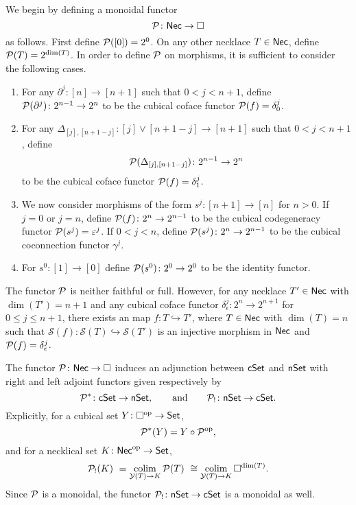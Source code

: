 We begin by defining a monoidal functor
\[
\mathcal{P} \colon \mathsf{Nec} \to \square
\]
as follows. First define $\mathcal{P}([0])=2^0$.
On any other necklace $T \in \mathsf{Nec}$, define $\mathcal{P}(T) = 2^{\dim(T)}$.
In order to define $\mathcal{P}$ on morphisms, it is sufficient to consider the following cases.
\begin{enumerate}
	\item For any $\partial^j \colon [n] \to [n+1]$ such that $0< j<{n+1}$, define $\mathcal{P}(\partial^j) \colon 2^{n-1}\to 2^{n}$ to be the cubical coface functor $\mathcal{P}(f)= \delta_0^{j}$.

	\item For any $\Delta_{[j], [n+1-j]} \colon [j] \vee [n+1-j] \to [n+1]$ such that $0<j<n+1$, define
	\[
	\mathcal{P}(\Delta_{[j], [n+1-j]}) \colon 2^{n-1}\to 2^{n}
	\]
	to be the cubical coface functor $\mathcal{P}(f)=\delta_1^{j}$.

	\item We now consider morphisms of the form $s^j \colon [n+1] \to [n]$ for $n>0$.
	If $j=0$ or $j=n$, define $\mathcal{P}(f) \colon 2^n \to 2^{n-1}$ to be the cubical codegeneracy functor $\mathcal{P}(s^j)= \varepsilon^{j}$.
	If $0<j<n$, define $\mathcal{P}(s^j) \colon 2^n \to 2^{n-1}$ to be the cubical coconnection functor $\gamma^{j}$.

	\item For $s^0 \colon [1] \to [0]$ define $\mathcal{P}(s^0) \colon 2^0 \to 2^0$ to be the identity functor.
\end{enumerate}

\begin{remark}
	The functor $\mathcal{P}$ is neither faithful or full.
	However, for any necklace $T' \in \mathsf{Nec}$ with $\dim(T')=n+1$ and any cubical coface functor $\delta_{\epsilon}^j \colon 2^n \to 2^{n+1}$ for $0 \leq j \leq n+1$, there exists an map $f \colon T \hookrightarrow T'$, where $T \in \mathsf{Nec}$ with $\dim(T)=n$ such that $\mathcal{S}(f) \colon \mathcal{S}(T) \hookrightarrow \mathcal{S}(T')$ is an injective morphism in $\mathsf{Nec}$ and $\mathcal{P}(f) = \delta_{\epsilon}^j$.

\end{remark}

The functor $\mathcal{P} \colon \mathsf{Nec} \to \square$ induces an adjunction between $\mathsf{cSet}$ and $\mathsf{nSet}$ with right and left adjoint functors given respectively by
\[
\mathcal{P}^\ast \colon \mathsf{cSet} \to \mathsf{nSet},
\qquad \text{and} \qquad
\mathcal{P}_{!} \colon \mathsf{nSet} \to \mathsf{cSet}.
\]
Explicitly, for a cubical set $Y \colon \square^{\mathrm{op}} \to \mathsf{Set}$,
\[
\mathcal{P}^\ast(Y)= Y \circ \mathcal{P}^{\mathrm{op}},
\]
and for a necklical set $K \colon \mathsf{Nec}^{\mathrm{op}} \to \mathsf{Set}$,
\[
\mathcal{P}_{!}(K) \ =
\operatorname*{colim}_{\mathcal{Y}(T) \to K} \mathcal{P}(T) \ \cong
\operatorname*{colim}_{\mathcal{Y}(T) \to K} \square^{\dim(T)}.
\]
Since $\mathcal{P}$ is a monoidal, the functor $\mathcal{P}_{!} \colon \mathsf{nSet} \to \mathsf{cSet}$ is a monoidal as well.

